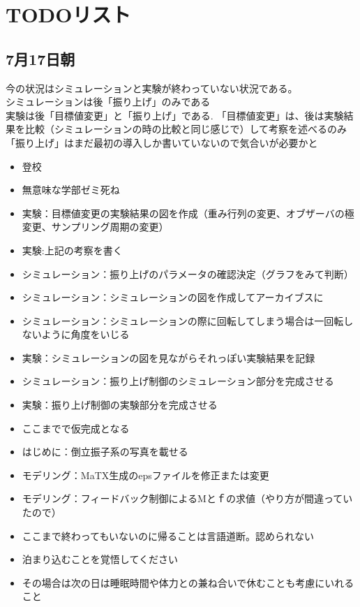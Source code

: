  \section{TODOリスト}
 \subsection{7月17日朝}
 今の状況はシミュレーションと実験が終わっていない状況である。\\
 シミュレーションは後「振り上げ」のみである\\
 実験は後「目標値変更」と「振り上げ」である.
 「目標値変更」は、後は実験結果を比較（シミュレーションの時の比較と同じ感じで）して考察を述べるのみ
 「振り上げ」はまだ最初の導入しか書いていないので気合いが必要かと
 \begin{itemize}
   \item 登校
   \item 無意味な学部ゼミ死ね
   \item 実験：目標値変更の実験結果の図を作成（重み行列の変更、オブザーバの極変更、サンプリング周期の変更）
   \item 実験:上記の考察を書く
   \item シミュレーション：振り上げのパラメータの確認決定（グラフをみて判断）
   \item シミュレーション：シミュレーションの図を作成してアーカイブスに
   \item シミュレーション：シミュレーションの際に回転してしまう場合は一回転しないように角度をいじる
   \item 実験：シミュレーションの図を見ながらそれっぽい実験結果を記録
   \item シミュレーション：振り上げ制御のシミュレーション部分を完成させる
   \item 実験：振り上げ制御の実験部分を完成させる
   \item ここまでで仮完成となる
   \item はじめに：倒立振子系の写真を載せる
   \item モデリング：MaTX生成のepsファイルを修正または変更
   \item モデリング：フィードバック制御によるMとｆの求値（やり方が間違っていたので）
   \item ここまで終わってもいないのに帰ることは言語道断。認められない
   \item 泊まり込むことを覚悟してください
   \item その場合は次の日は睡眠時間や体力との兼ね合いで休むことも考慮にいれること
 \end{itemize}
